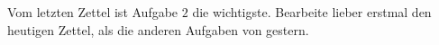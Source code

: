\documentclass{../uebungszettel}
\begin{document}
\noindent
Vom letzten Zettel ist Aufgabe $2$ die wichtigste.
Bearbeite lieber erstmal den heutigen Zettel, als die anderen Aufgaben von gestern.





\pagebreak


\end{document}
